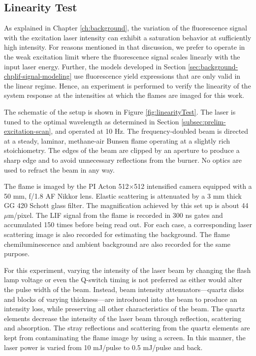 \subsection{Linearity Test}
\label{subsec:prelim-linearity-test}

As explained in Chapter \ref{ch:background}, the variation of the fluorescence signal with the excitation laser intensity can exhibit a saturation behavior at sufficiently high intensity.
For reasons mentioned in that discussion, we prefer to operate in the weak excitation limit where the fluorescence signal scales linearly with the input laser energy.
Further, the models developed in Section \ref{sec:background-chplif-signal-modeling} use fluorescence yield expressions that are only valid in the linear regime.
Hence, an experiment is performed to verify the linearity of the system response at the intensities at which the flames are imaged for this work.

The schematic of the setup is shown in Figure \ref{fig:linearityTest}.
The laser is tuned to the optimal wavelength as determined in Section \ref{subsec:prelim-excitation-scan}, and operated at 10 Hz.
The frequency-doubled beam is directed at a steady, laminar, methane-air Bunsen flame operating at a slightly rich stoichiometry.
The edges of the beam are clipped by an aperture to produce a sharp edge and to avoid unnecessary reflections from the burner.
No optics are used to refract the beam in any way.



The flame is imaged by the PI Acton 512\(\times\)512 intensified camera equipped with a 50 mm, f/1.8 AF Nikkor lens.
Elastic scattering is attenuated by a 3 mm thick GG 420 Schott glass filter.
The magnification achieved by this set up is about 44 \(\mu\)m/pixel.
The LIF signal from the flame is recorded in 300 ns gates and accumulated 150 times before being read out.
For each case, a corresponding laser scattering image is also recorded for estimating the background.
The flame chemiluminescence and ambient background are also recorded for the same purpose.

For this experiment, varying the intensity of the laser beam by changing the flash lamp voltage or even the Q-switch timing is not preferred as either would alter the pulse width of the beam.
Instead, beam intensity attenuators---quartz disks and blocks of varying thickness---are introduced into the beam to produce an intensity loss, while preserving all other characteristics of the beam.
The quartz elements decrease the intensity of the laser beam through reflection, scattering and absorption.
The stray reflections and scattering from the quartz elements are kept from contaminating the flame image by using a screen.
In this manner, the laser power is varied from 10 mJ/pulse to 0.5 mJ/pulse and back.

